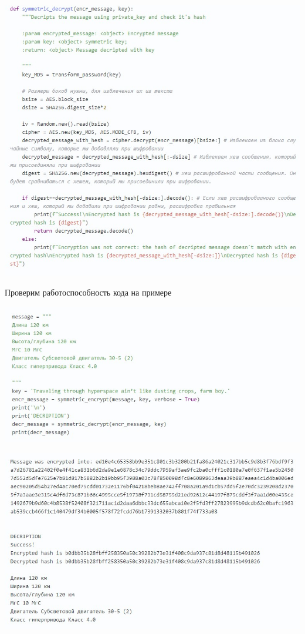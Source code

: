 \documentclass[12pt]{article}
\begin{document}
\begin{center}
	\includegraphics[width=1\linewidth]{pictures/code2.jpg}
\end{center}
\vspace{10cm}
	Проверим работоспособность кода на примере
	
	\begin{center}
		\includegraphics[width=1\linewidth]{pictures/code3.jpg}
	\end{center}
	
	\begin{center}
		\includegraphics[width=1\linewidth]{pictures/code4.jpg}
	\end{center}
\end{document}
